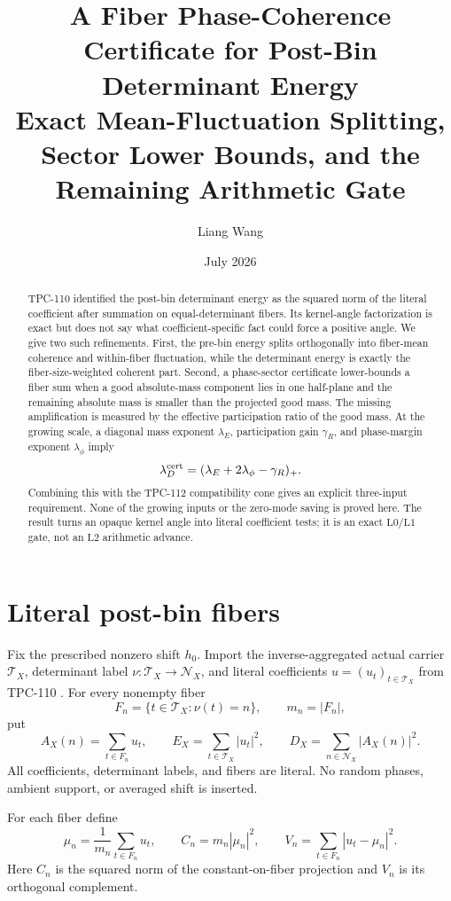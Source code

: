 \documentclass[11pt]{article}
\title{\textbf{A Fiber Phase-Coherence Certificate for Post-Bin
Determinant Energy}\\
\large Exact Mean-Fluctuation Splitting, Sector Lower Bounds, and the
Remaining Arithmetic Gate}
\author{Liang Wang}
\date{July 2026}
\theoremstyle{definition}
\theoremstyle{remark}
\newcommand{\cT}{\mathcal T}
\newcommand{\cN}{\mathcal N}
\newcommand{\Lzero}{\mathrm{L0}}
\newcommand{\Lone}{\mathrm{L1}}
\newcommand{\Ltwo}{\mathrm{L2}}
\begin{document}
\maketitle

\begin{abstract}
TPC-110 identified the post-bin determinant energy as the squared
norm of the literal coefficient after summation on equal-determinant
fibers.  Its kernel-angle factorization is exact but does not say what
coefficient-specific fact could force a positive angle.  We give two
such refinements.  First, the pre-bin energy splits orthogonally into
fiber-mean coherence and within-fiber fluctuation, while the
determinant energy is exactly the fiber-size-weighted coherent part.
Second, a phase-sector certificate lower-bounds a fiber sum when a
good absolute-mass component lies in one half-plane and the remaining
absolute mass is smaller than the projected good mass.  The missing
amplification is measured by the effective participation ratio of the
good mass.  At the growing scale, a diagonal mass exponent
\(\lambda_E\), participation gain \(\gamma_R\), and phase-margin
exponent \(\lambda_\phi\) imply
\[
 \lambda_D^{\rm cert}
 =(\lambda_E+2\lambda_\phi-\gamma_R)_+.
\]
Combining this with the TPC-112 compatibility cone gives an explicit
three-input requirement.  None of the growing inputs or the zero-mode
saving is proved here.  The result turns an opaque kernel angle into
literal coefficient tests; it is an exact \(\Lzero/\Lone\) gate, not
an \(\Ltwo\) arithmetic advance.
\end{abstract}

\section{Literal post-bin fibers}

Fix the prescribed nonzero shift \(h_0\).  Import the inverse-aggregated
actual carrier \(\cT_X\), determinant label
\(\nu:\cT_X\to\cN_X\), and literal coefficients
\(u=(u_t)_{t\in\cT_X}\) from TPC-110 \citep{WangTPC110}.  For every
nonempty fiber
\[
 F_n=\{t\in\cT_X:\nu(t)=n\},\qquad m_n=|F_n|,
\]
put
\[
 A_X(n)=\sum_{t\in F_n}u_t,\qquad
 E_X=\sum_{t\in\cT_X}|u_t|^2,\qquad
 D_X=\sum_{n\in\cN_X}|A_X(n)|^2.
\]
All coefficients, determinant labels, and fibers are literal.  No
random phases, ambient support, or averaged shift is inserted.

For each fiber define
\[
 \mu_n=\frac1{m_n}\sum_{t\in F_n}u_t,\qquad
 C_n=m_n|\mu_n|^2,\qquad
 V_n=\sum_{t\in F_n}|u_t-\mu_n|^2.
\]
Here \(C_n\) is the squared norm of the constant-on-fiber projection
and \(V_n\) is its orthogonal complement.
\end{document}
